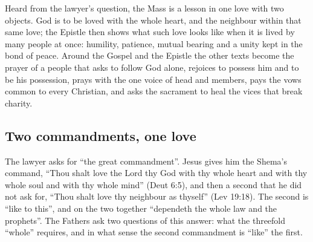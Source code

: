 \label{sec:whole-heart-one-body}

Heard from the lawyer's question, the Mass is a lesson in one love with two
objects. God is to be loved with the whole heart, and the neighbour within
that same love; the Epistle then shows what such love looks like when it is
lived by many people at once: humility, patience, mutual bearing and a unity
kept in the bond of peace. Around the Gospel and the Epistle the other texts
become the prayer of a people that asks to follow God alone, rejoices to
possess him and to be his possession, prays with the one voice of head and
members, pays the vows common to every Christian, and asks the sacrament to
heal the vices that break charity.

\subsection{Two commandments, one love}

The lawyer asks for ``the great commandment''. Jesus gives him the Shema's
command, ``Thou shalt love the Lord thy God with thy whole heart and with thy
whole soul and with thy whole mind'' (Deut 6:5), and then a second that he did
not ask for, ``Thou shalt love thy neighbour as thyself'' (Lev 19:18). The
second is ``like to this'', and on the two together ``dependeth the whole law
and the prophets''. The Fathers ask two questions of this answer: what the
threefold ``whole'' requires, and in what sense the second commandment is
``like'' the first.

